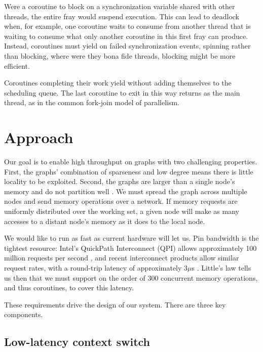 \documentclass{acm_proc_article-sp}
\begin{document}
 Were a coroutine to
block on a synchronization variable shared with other threads, the
entire fray would suspend execution.  This can lead to deadlock when,
for example, one coroutine waits to consume from another thread that
is waiting to consume what only another coroutine in this first fray
can produce.  Instead, coroutines must yield on failed synchronization
events, spinning rather than blocking, where were they bona fide
threads, blocking might be more efficient.


Coroutines completing their work yield without adding themselves to
the scheduling queue.  The last coroutine to exit in this way returns
as the main thread, as in the common  fork-join model of parallelism.


\section{Approach}

Our goal is to enable high throughput on graphs with two challenging
properties. First, the graphs' combination of sparseness and low
degree means there is little locality to be exploited. Second, the
graphs are larger than a single node's memory and do not partition
well . We must spread the graph across multiple nodes
and send memory operations over a network. If memory requests are
uniformly distributed over the working set, a given node will make as
many accesses to a distant node's memory as it does to the local node.

We would like to run as fast as current hardware will let us. Pin
bandwidth is the tightest resource: Intel's QuickPath Interconnect
(QPI) allows approximately 100 million requests per second
, and recent interconnect products allow similar request
rates, with a round-trip latency of approximately 3$\mu$s
. Little's law tells us then that we must support on the
order of 300 concurrent memory operations, and thus coroutines, to
cover this latency.

These requirements drive the design of our system. There are three key
components.

\subsection{Low-latency context switch}
\end{document}
